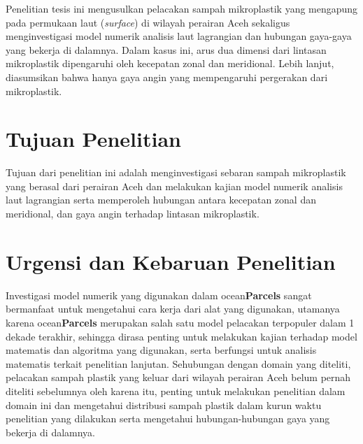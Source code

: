 \begin{spacing}{1.5}
	
	
	Penelitian tesis ini mengusulkan pelacakan sampah mikroplastik yang mengapung pada permukaan laut (\textit{surface}) di wilayah perairan Aceh sekaligus menginvestigasi model numerik analisis laut lagrangian dan hubungan gaya-gaya yang bekerja di dalamnya.  Dalam kasus ini, arus dua dimensi dari lintasan mikroplastik dipengaruhi oleh kecepatan zonal dan meridional. Lebih lanjut, diasumsikan bahwa hanya gaya angin yang mempengaruhi pergerakan dari mikroplastik.
	
%	
%	
	\section[Tujuan Penelitian]{Tujuan Penelitian}
	
	Tujuan dari penelitian ini adalah menginvestigasi sebaran sampah mikroplastik yang berasal dari perairan Aceh dan melakukan kajian model numerik analisis laut lagrangian serta memperoleh hubungan antara kecepatan zonal dan meridional, dan gaya angin terhadap lintasan mikroplastik. 
	
	\section[Urgensi dan Kebaruan Penelitian]{Urgensi dan Kebaruan Penelitian}

	Investigasi model numerik yang digunakan dalam ocean\textbf{Parcels} sangat bermanfaat untuk mengetahui cara kerja dari alat yang digunakan, utamanya karena ocean\textbf{Parcels} merupakan salah satu model pelacakan terpopuler dalam 1 dekade terakhir, sehingga dirasa penting untuk melakukan kajian terhadap model matematis dan algoritma yang digunakan, serta berfungsi untuk analisis matematis terkait penelitian lanjutan. Sehubungan dengan domain yang diteliti, pelacakan sampah plastik yang keluar dari wilayah perairan Aceh belum pernah diteliti sebelumnya oleh karena itu, penting untuk melakukan penelitian dalam domain ini dan mengetahui distribusi sampah plastik dalam kurun waktu penelitian yang dilakukan serta mengetahui hubungan-hubungan gaya yang bekerja di dalamnya.


\end{spacing}
